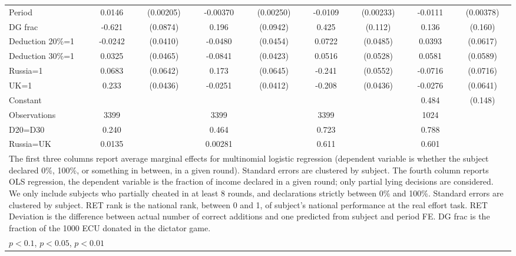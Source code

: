 \begin{tabular}{l|cccccc|cc}
Period          &   0.0146\sym{***}&(0.00205)& -0.00370         &(0.00250)&  -0.0109\sym{***}&(0.00233)&  -0.0111\sym{***}&(0.00378)\\
DG frac         &   -0.621\sym{***}& (0.0874)&    0.196\sym{**} & (0.0942)&    0.425\sym{***}&  (0.112)&    0.136         &  (0.160)\\
Deduction 20\%=1&  -0.0242         & (0.0410)&  -0.0480         & (0.0454)&   0.0722         & (0.0485)&   0.0393         & (0.0617)\\
Deduction 30\%=1&   0.0325         & (0.0465)&  -0.0841\sym{**} & (0.0423)&   0.0516         & (0.0528)&   0.0581         & (0.0589)\\
Russia=1        &   0.0683         & (0.0642)&    0.173\sym{***}& (0.0645)&   -0.241\sym{***}& (0.0552)&  -0.0716         & (0.0716)\\
UK=1            &    0.233\sym{***}& (0.0436)&  -0.0251         & (0.0412)&   -0.208\sym{***}& (0.0436)&  -0.0276         & (0.0641)\\
Constant        &                  &         &                  &         &                  &         &    0.484\sym{***}&  (0.148)\\
\hline
Observations    &     3399         &         &     3399         &         &     3399         &         &     1024         &         \\
D20=D30         &    0.240         &         &    0.464         &         &    0.723         &         &    0.788         &         \\
Russia=UK       &   0.0135         &         &  0.00281         &         &    0.611         &         &    0.601         &         \\
\hline\hline
\multicolumn{9}{p{16cm}}{\tiny The first three columns report average marginal effects for multinomial logistic regression (dependent variable is whether the subject declared 0\%, 100\%, or something in between, in a given round). Standard errors are clustered by subject. The fourth column reports OLS regression, the dependent variable is the fraction of income declared in a given round; only partial lying decisions are considered. We only include subjects who partially cheated in at least 8 rounds, and declarations strictly between 0\% and 100\%. Standard errors are clustered by subject. RET rank is the national rank, between 0 and 1, of subject's national performance at the real effort task. RET Deviation is the difference between actual number of correct additions and one predicted from subject and period FE. DG frac is the fraction of the 1000 ECU donated in the dictator game.}\\
\multicolumn{9}{l}{\tiny \sym{*} \(p<0.1\), \sym{**} \(p<0.05\), \sym{***} \(p<0.01\)}\\
\end{tabular}